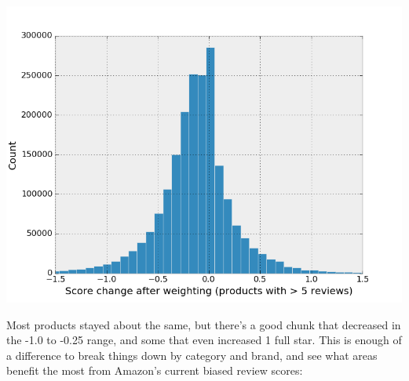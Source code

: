 \documentclass[a4paper,10pt]{article}
\begin{document}
\begin{center}
    \includegraphics[scale=0.65]{normascore_changes.png}
\end{center}

Most products stayed about the same, but there's a good chunk that decreased in the -1.0 to -0.25 range, and some that even increased 1 full star. This is enough of a difference to break things down by category and brand, and see what areas benefit the most from Amazon's current biased review scores:
\end{document}
